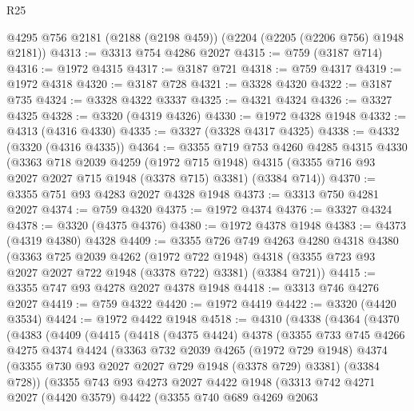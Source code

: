\begin{lexlean}{R25}
\begin{coremodule}
    @4295
    @756
    @2181
    (@2188 (@2198 @459))
    (@2204 (@2205 (@2206 @756) @1948 @2181))
@4313 := @3313 @754 @4286 @2027
@4315 := @759 (@3187 @714)
@4316 := @1972 @4315
@4317 := @3187 @721
@4318 := @759 @4317
@4319 := @1972 @4318
@4320 := @3187 @728
@4321 := @3328 @4320
@4322 := @3187 @735
@4324 := @3328 @4322 @3337
@4325 := @4321 @4324
@4326 := @3327 @4325
@4328 := @3320 (@4319 @4326)
@4330 := @1972 @4328 @1948
@4332 := @4313 (@4316 @4330)
@4335 := @3327 (@3328 @4317 @4325)
@4338 := @4332 (@3320 (@4316 @4335))
@4364 := @3355
    @719
    @753
    @4260
    @4285
    @4315
    @4330
    (@3363
      @718
      @2039
      @4259
      (@1972 @715 @1948)
      @4315
      (@3355 @716 @93 @2027 @2027 @715 @1948 (@3378 @715) @3381)
      (@3384 @714))
@4370 := @3355 @751 @93 @4283 @2027 @4328 @1948
@4373 := @3313 @750 @4281 @2027
@4374 := @759 @4320
@4375 := @1972 @4374
@4376 := @3327 @4324
@4378 := @3320 (@4375 @4376)
@4380 := @1972 @4378 @1948
@4383 := @4373 (@4319 @4380) @4328
@4409 := @3355
    @726
    @749
    @4263
    @4280
    @4318
    @4380
    (@3363
      @725
      @2039
      @4262
      (@1972 @722 @1948)
      @4318
      (@3355 @723 @93 @2027 @2027 @722 @1948 (@3378 @722) @3381)
      (@3384 @721))
@4415 := @3355 @747 @93 @4278 @2027 @4378 @1948
@4418 := @3313 @746 @4276 @2027
@4419 := @759 @4322
@4420 := @1972 @4419
@4422 := @3320 (@4420 @3534)
@4424 := @1972 @4422 @1948
@4518 := @4310
    (@4338
      (@4364
        (@4370
          (@4383
            (@4409
              (@4415
                (@4418
                  (@4375 @4424)
                  @4378
                  (@3355
                    @733
                    @745
                    @4266
                    @4275
                    @4374
                    @4424
                    (@3363
                      @732
                      @2039
                      @4265
                      (@1972 @729 @1948)
                      @4374
                      (@3355 @730 @93 @2027 @2027 @729 @1948 (@3378 @729) @3381)
                      (@3384 @728))
                    (@3355
                      @743
                      @93
                      @4273
                      @2027
                      @4422
                      @1948
                      (@3313
                        @742
                        @4271
                        @2027
                        (@4420 @3579)
                        @4422
                        (@3355
                          @740
                          @689
                          @4269
                          @2063

\end{coremodule}
\end{lexlean}
